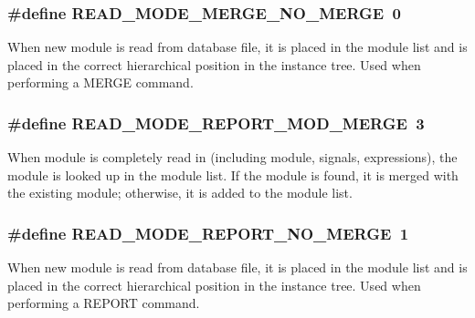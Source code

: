 \subsubsection{\setlength{\rightskip}{0pt plus 5cm}\#define READ\_\-MODE\_\-MERGE\_\-NO\_\-MERGE\ 0}\label{group__read__modes_a0}


When new module is read from database file, it is placed in the module list and is placed in the correct hierarchical position in the instance tree. Used when performing a MERGE command. 
\subsubsection{\setlength{\rightskip}{0pt plus 5cm}\#define READ\_\-MODE\_\-REPORT\_\-MOD\_\-MERGE\ 3}\label{group__read__modes_a3}


When module is completely read in (including module, signals, expressions), the module is looked up in the module list. If the module is found, it is merged with the existing module; otherwise, it is added to the module list. 
\subsubsection{\setlength{\rightskip}{0pt plus 5cm}\#define READ\_\-MODE\_\-REPORT\_\-NO\_\-MERGE\ 1}\label{group__read__modes_a1}


When new module is read from database file, it is placed in the module list and is placed in the correct hierarchical position in the instance tree. Used when performing a REPORT command. 